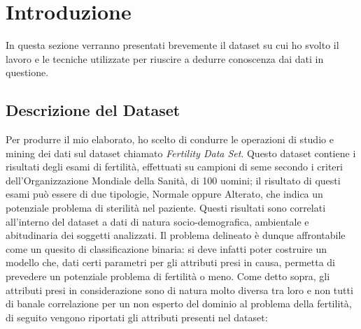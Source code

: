   \section{Introduzione}
  In questa sezione verranno presentati brevemente il dataset su cui ho svolto il lavoro e le tecniche utilizzate per riuscire a dedurre conoscenza dai dati in questione.
  \subsection{Descrizione del Dataset}
  Per produrre il mio elaborato, ho scelto di condurre le operazioni di studio e mining dei dati sul dataset chiamato \textit{Fertility Data Set}.
  Questo dataset contiene i risultati degli esami di fertilità, effettuati su campioni di seme secondo i criteri dell'Organizzazione Mondiale della Sanità, di 100 uomini; il risultato di questi esami può essere di due tipologie, Normale oppure Alterato, che indica un potenziale problema di sterilità nel paziente. Questi risultati sono correlati all'interno del dataset a dati di natura socio-demografica, ambientale e abitudinaria dei soggetti analizzati. 
  Il problema delineato è dunque affrontabile come un quesito di  classificazione binaria: si deve infatti poter costruire un modello che, dati certi parametri per gli attributi presi in causa, permetta di prevedere un potenziale problema di fertilità o meno.
  Come detto sopra, gli attributi presi in considerazione sono di natura molto diversa tra loro e non tutti di banale correlazione per un non esperto del dominio al problema della fertilità, di seguito vengono riportati gli attributi presenti nel dataset:
